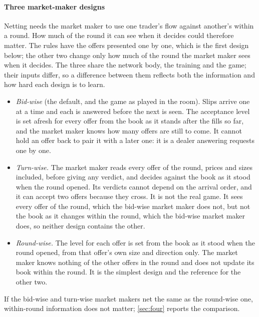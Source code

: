 \documentclass[11pt,a4paper]{article}
\theoremstyle{plain}
\theoremstyle{definition}
\newcommand{\1}{\mathbf{1}}
\begin{document}
\paragraph{Three market-maker designs}
Netting needs the market maker to use one trader's flow against another's within a round. How much of the round it can see when it decides could therefore matter. The rules have the offers presented one by one, which is the first design below; the other two change only how much of the round the market maker sees when it decides. The three share the network body, the training and the game; their inputs differ, so a difference between them reflects both the information and how hard each design is to learn.
\begin{itemize}
\item \emph{Bid-wise} (the default, and the game as played in the room). Slips arrive one at a time and each is answered before the next is seen. The acceptance level is set afresh for every offer from the book as it stands after the fills so far, and the market maker knows how many offers are still to come. It cannot hold an offer back to pair it with a later one: it is a dealer answering requests one by one.
\item \emph{Turn-wise.} The market maker reads every offer of the round, prices and sizes included, before giving any verdict, and decides against the book as it stood when the round opened. Its verdicts cannot depend on the arrival order, and it can accept two offers because they cross. It is not the real game. It sees every offer of the round, which the bid-wise market maker does not, but not the book as it changes within the round, which the bid-wise market maker does, so neither design contains the other.
\item \emph{Round-wise.} The level for each offer is set from the book as it stood when the round opened, from that offer's own size and direction only. The market maker knows nothing of the other offers in the round and does not update its book within the round. It is the simplest design and the reference for the other two.
\end{itemize}
If the bid-wise and turn-wise market makers net the same as the round-wise one, within-round information does not matter; \cref{sec:four} reports the comparison.
\end{document}
